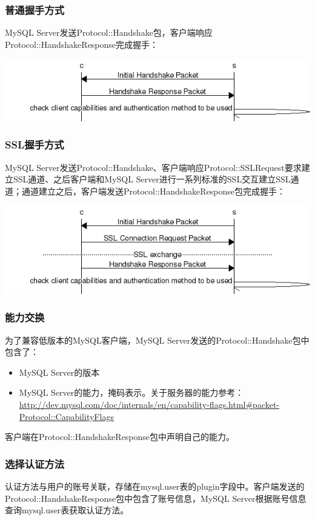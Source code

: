 \documentclass[a4paper, titlepage, 10pt, bookmark]{article}
\begin{document}
\subsubsection{普通握手方式}
MySQL Server发送Protocol::Handshake包，客户端响应Protocol::HandshakeResponse完成握手：
\begin{center}
\includegraphics[width=6in]{003.png}
\end{center}

\subsubsection{SSL握手方式}
MySQL Server发送Protocol::Handshake、客户端响应Protocol::SSLRequest要求建立SSL通道、之后客户端和MySQL Server进行一系列标准的SSL交互建立SSL通道；通道建立之后，客户端发送Protocol::HandshakeResponse包完成握手：
\begin{center}
\includegraphics[width=6in]{004.png}
\end{center}

\subsubsection{能力交换}
为了兼容低版本的MySQL客户端，MySQL Server发送的Protocol::Handshake包中包含了：
\begin{itemize}
    \item MySQL Server的版本
    \item MySQL Server的能力，掩码表示。关于服务器的能力参考：\url{http://dev.mysql.com/doc/internals/en/capability-flags.html#packet-Protocol::CapabilityFlags}
\end{itemize}

客户端在Protocol::HandshakeResponse包中声明自己的能力。

\subsubsection{选择认证方法}
认证方法与用户的账号关联，存储在mysql.user表的plugin字段中。客户端发送的Protocol::HandshakeResponse包中包含了账号信息，MySQL Server根据账号信息查询mysql.user表获取认证方法。\\
\end{document}
